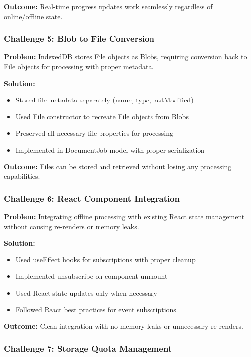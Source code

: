 \documentclass[11pt, a4paper]{article}
\theoremstyle{plain}
\theoremstyle{definition}
\begin{document}
\textbf{Outcome:} Real-time progress updates work seamlessly regardless of online/offline state.

\subsubsection{Challenge 5: Blob to File Conversion}

\textbf{Problem:} IndexedDB stores File objects as Blobs, requiring conversion back to File objects for processing with proper metadata.

\textbf{Solution:}
\begin{itemize}
    \item Stored file metadata separately (name, type, lastModified)
    \item Used File constructor to recreate File objects from Blobs
    \item Preserved all necessary file properties for processing
    \item Implemented in DocumentJob model with proper serialization
\end{itemize}

\textbf{Outcome:} Files can be stored and retrieved without losing any processing capabilities.

\subsubsection{Challenge 6: React Component Integration}

\textbf{Problem:} Integrating offline processing with existing React state management without causing re-renders or memory leaks.

\textbf{Solution:}
\begin{itemize}
    \item Used useEffect hooks for subscriptions with proper cleanup
    \item Implemented unsubscribe on component unmount
    \item Used React state updates only when necessary
    \item Followed React best practices for event subscriptions
\end{itemize}

\textbf{Outcome:} Clean integration with no memory leaks or unnecessary re-renders.

\subsubsection{Challenge 7: Storage Quota Management}
\end{document}
